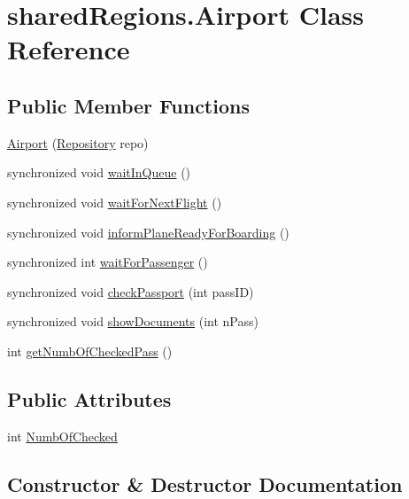 \hypertarget{classshared_regions_1_1_airport}{}\section{shared\+Regions.\+Airport Class Reference}
\label{classshared_regions_1_1_airport}
\subsection*{Public Member Functions}
\begin{DoxyCompactItemize}
\item 
\hyperlink{classshared_regions_1_1_airport_ab97f458db451c5230a7d596b147034b2}{Airport} (\hyperlink{classshared_regions_1_1_repository}{Repository} repo)
\item 
synchronized void \hyperlink{classshared_regions_1_1_airport_a96f0b64b0a1a814d9f9916a688af4477}{wait\+In\+Queue} ()
\item 
synchronized void \hyperlink{classshared_regions_1_1_airport_a7ee042433a9a1633605570a11a294ea0}{wait\+For\+Next\+Flight} ()
\item 
synchronized void \hyperlink{classshared_regions_1_1_airport_a07a8dabf9bd3f1d90ef4b9f8fa26d732}{inform\+Plane\+Ready\+For\+Boarding} ()
\item 
synchronized int \hyperlink{classshared_regions_1_1_airport_af0a8b9670f4f72400f35a790990d96d2}{wait\+For\+Passenger} ()
\item 
synchronized void \hyperlink{classshared_regions_1_1_airport_a1dba750b542f28455a143973bbc877a0}{check\+Passport} (int pass\+ID)
\item 
synchronized void \hyperlink{classshared_regions_1_1_airport_a1a232f9b0f1311fd95665de744d871c8}{show\+Documents} (int n\+Pass)
\item 
int \hyperlink{classshared_regions_1_1_airport_a7b6204177fb19b848d01c57048bc2c69}{get\+Numb\+Of\+Checked\+Pass} ()
\end{DoxyCompactItemize}
\subsection*{Public Attributes}
\begin{DoxyCompactItemize}
\item 
int \hyperlink{classshared_regions_1_1_airport_a98b658940575f64bf637e5986c100d83}{Numb\+Of\+Checked}
\end{DoxyCompactItemize}


\subsection{Constructor \& Destructor Documentation}
\mbox{\label{classshared_regions_1_1_airport_ab97f458db451c5230a7d596b147034b2}} 
